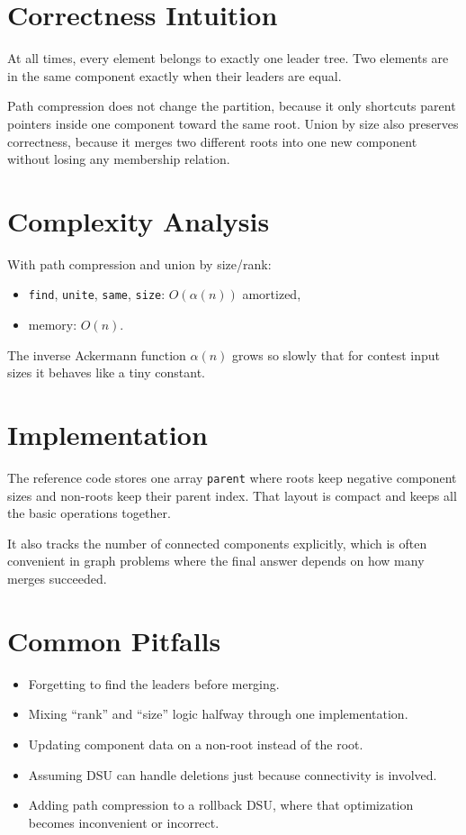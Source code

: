 \section*{Correctness Intuition}

At all times, every element belongs to exactly one leader tree. Two elements are in the same component exactly when
their leaders are equal.

Path compression does not change the partition, because it only shortcuts parent pointers inside one component toward
the same root. Union by size also preserves correctness, because it merges two different roots into one new component
without losing any membership relation.

\section*{Complexity Analysis}

With path compression and union by size/rank:

\begin{itemize}
  \item \texttt{find}, \texttt{unite}, \texttt{same}, \texttt{size}: \(O(\alpha(n))\) amortized,
  \item memory: \(O(n)\).
\end{itemize}

The inverse Ackermann function \(\alpha(n)\) grows so slowly that for contest input sizes it behaves like a tiny
constant.

\section*{Implementation}

The reference code stores one array \texttt{parent} where roots keep negative component sizes and non-roots keep their
parent index. That layout is compact and keeps all the basic operations together.

It also tracks the number of connected components explicitly, which is often convenient in graph problems where the
final answer depends on how many merges succeeded.

\section*{Common Pitfalls}

\begin{itemize}
  \item Forgetting to find the leaders before merging.
  \item Mixing ``rank'' and ``size'' logic halfway through one implementation.
  \item Updating component data on a non-root instead of the root.
  \item Assuming DSU can handle deletions just because connectivity is involved.
  \item Adding path compression to a rollback DSU, where that optimization becomes inconvenient or incorrect.
\end{itemize}

